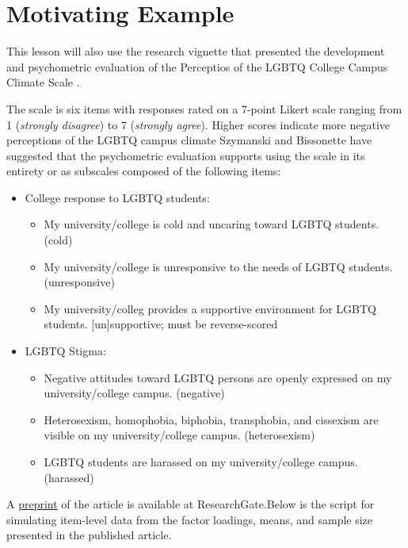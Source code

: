\documentclass[
  english,
]{book}
\providecommand{\tightlist}{%
  \setlength{\itemsep}{0pt}\setlength{\parskip}{0pt}}
\begin{document}
\hypertarget{motivating-example}{%
\section{Motivating Example}\label{motivating-example}}

This lesson will also use the research vignette that presented the development and psychometric evaluation of the Perceptios of the LGBTQ College Campus Climate Scale \citep{szymanski_perceptions_2020}.

The scale is six items with responses rated on a 7-point Likert scale ranging from 1 (\emph{strongly disagree}) to 7 (\emph{strongly agree}). Higher scores indicate more negative perceptions of the LGBTQ campus climate Szymanski and Bissonette have suggested that the psychometric evaluation supports using the scale in its entirety or as subscales composed of the following items:

\begin{itemize}
\tightlist
\item
  College response to LGBTQ students:

  \begin{itemize}
  \tightlist
  \item
    My university/college is cold and uncaring toward LGBTQ students. (cold)
  \item
    My university/college is unresponsive to the needs of LGBTQ students. (unresponsive)
  \item
    My university/colleg provides a supportive environment for LGBTQ students. {[}un{]}supportive; must be reverse-scored
  \end{itemize}
\item
  LGBTQ Stigma:

  \begin{itemize}
  \tightlist
  \item
    Negative attitudes toward LGBTQ persons are openly expressed on my university/college campus. (negative)
  \item
    Heterosexism, homophobia, biphobia, transphobia, and cissexism are visible on my university/college campus. (heterosexism)
  \item
    LGBTQ students are harassed on my university/college campus. (harassed)
  \end{itemize}
\end{itemize}

A \href{https://www.researchgate.net/publication/332062781_Perceptions_of_the_LGBTQ_College_Campus_Climate_Scale_Development_and_Psychometric_Evaluation/link/5ca0bef945851506d7377da7/download}{preprint} of the article is available at ResearchGate.Below is the script for simulating item-level data from the factor loadings, means, and sample size presented in the published article.
\end{document}

